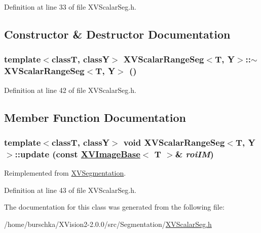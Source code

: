Definition at line 33 of file XVScalar\-Seg.h.

\subsection{Constructor \& Destructor Documentation}
\label{XVScalarRangeSeg_a1}
\hypertarget{class_XVScalarRangeSeg_a1}{
\subsubsection[~XVScalarRangeSeg]{\setlength{\rightskip}{0pt plus 5cm}template$<$classT, classY$>$ XVScalar\-Range\-Seg$<$T, Y$>$::$\sim$XVScalar\-Range\-Seg$<$T, Y$>$ ()}}




Definition at line 42 of file XVScalar\-Seg.h.

\subsection{Member Function Documentation}
\label{XVScalarRangeSeg_a2}
\hypertarget{class_XVScalarRangeSeg_a2}{
\subsubsection[update]{\setlength{\rightskip}{0pt plus 5cm}template$<$classT, classY$>$ void XVScalar\-Range\-Seg$<$T, Y$>$::update (const \hyperlink{class_XVImageBase}{XVImage\-Base}$<$ T $>$\& {\em roi\-IM})}}




Reimplemented from \hyperlink{class_XVSegmentation}{XVSegmentation}.

Definition at line 43 of file XVScalar\-Seg.h.

The documentation for this class was generated from the following file:\begin{CompactItemize}
\item 
/home/burschka/XVision2-2.0.0/src/Segmentation/\hyperlink{XVScalarSeg.h-source}{XVScalar\-Seg.h}\end{CompactItemize}
